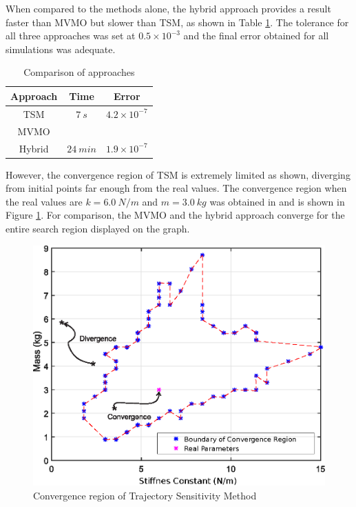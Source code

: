 When compared to the methods alone, the hybrid approach provides a result faster than MVMO but slower than TSM, as shown in Table \ref{tab: SM}. The tolerance for all three approaches was set at $0.5 \times 10^{-3}$ and the final error obtained for all simulations was adequate.

\begin{table}[]
	\caption{Comparison of approaches}
	\begin{center}
	\begin{tabular}{c|c|c}
		Approach & Time & Error \\
		\hline
		TSM  & $7 \ s$  & $4.2\times 10^{-7}$ \\
		MVMO  &   & \\
		Hybrid  & $24 \ min$  & $1.9\times 10^{-7}$
	\end{tabular}
	\end{center}
	\label{tab: SM}
\end{table}

However, the convergence region of TSM is extremely limited as shown, diverging from initial points far enough from the real values. The convergence region when the real values are $k = 6.0 \ N/m$ and $m = 3.0 \ kg$ was obtained in \cite{Ecyo} and is shown in Figure \ref{fig: conv_reg}. For comparison, the MVMO and the hybrid approach converge for the entire search region displayed on the graph.

\begin{figure}[h]
	\caption{Convergence region of Trajectory Sensitivity Method}
	\begin{center}
		\includegraphics[scale=0.8]{Images/Conv_reg.eps}
	\end{center}
	\label{fig: conv_reg}
\end{figure}

